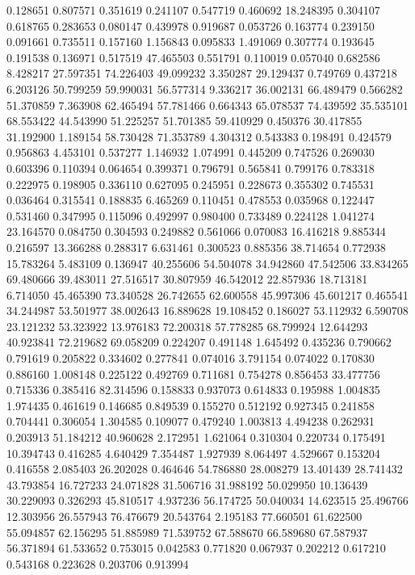 0.128651
0.807571
0.351619
0.241107
0.547719
0.460692
18.248395
0.304107
0.618765
0.283653
0.080147
0.439978
0.919687
0.053726
0.163774
0.239150
0.091661
0.735511
0.157160
1.156843
0.095833
1.491069
0.307774
0.193645
0.191538
0.136971
0.517519
47.465503
0.551791
0.110019
0.057040
0.682586
8.428217
27.597351
74.226403
49.099232
3.350287
29.129437
0.749769
0.437218
6.203126
50.799259
59.990031
56.577314
9.336217
36.002131
66.489479
0.566282
51.370859
7.363908
62.465494
57.781466
0.664343
65.078537
74.439592
35.535101
68.553422
44.543990
51.225257
51.701385
59.410929
0.450376
30.417855
31.192900
1.189154
58.730428
71.353789
4.304312
0.543383
0.198491
0.424579
0.956863
4.453101
0.537277
1.146932
1.074991
0.445209
0.747526
0.269030
0.603396
0.110394
0.064654
0.399371
0.796791
0.565841
0.799176
0.783318
0.222975
0.198905
0.336110
0.627095
0.245951
0.228673
0.355302
0.745531
0.036464
0.315541
0.188835
6.465269
0.110451
0.478553
0.035968
0.122447
0.531460
0.347995
0.115096
0.492997
0.980400
0.733489
0.224128
1.041274
23.164570
0.084750
0.304593
0.249882
0.561066
0.070083
16.416218
9.885344
0.216597
13.366288
0.288317
6.631461
0.300523
0.885356
38.714654
0.772938
15.783264
5.483109
0.136947
40.255606
54.504078
34.942860
47.542506
33.834265
69.480666
39.483011
27.516517
30.807959
46.542012
22.857936
18.713181
6.714050
45.465390
73.340528
26.742655
62.600558
45.997306
45.601217
0.465541
34.244987
53.501977
38.002643
16.889628
19.108452
0.186027
53.112932
6.590708
23.121232
53.323922
13.976183
72.200318
57.778285
68.799924
12.644293
40.923841
72.219682
69.058209
0.224207
0.491148
1.645492
0.435236
0.790662
0.791619
0.205822
0.334602
0.277841
0.074016
3.791154
0.074022
0.170830
0.886160
1.008148
0.225122
0.492769
0.711681
0.754278
0.856453
33.477756
0.715336
0.385416
82.314596
0.158833
0.937073
0.614833
0.195988
1.004835
1.974435
0.461619
0.146685
0.849539
0.155270
0.512192
0.927345
0.241858
0.704441
0.306054
1.304585
0.109077
0.479240
1.003813
4.494238
0.262931
0.203913
51.184212
40.960628
2.172951
1.621064
0.310304
0.220734
0.175491
10.394743
0.416285
4.640429
7.354487
1.927939
8.064497
4.529667
0.153204
0.416558
2.085403
26.202028
0.464646
54.786880
28.008279
13.401439
28.741432
43.793854
16.727233
24.071828
31.506716
31.988192
50.029950
10.136439
30.229093
0.326293
45.810517
4.937236
56.174725
50.040034
14.623515
25.496766
12.303956
26.557943
76.476679
20.543764
2.195183
77.660501
61.622500
55.094857
62.156295
51.885989
71.539752
67.588670
66.589680
67.587937
56.371894
61.533652
0.753015
0.042583
0.771820
0.067937
0.202212
0.617210
0.543168
0.223628
0.203706
0.913994
